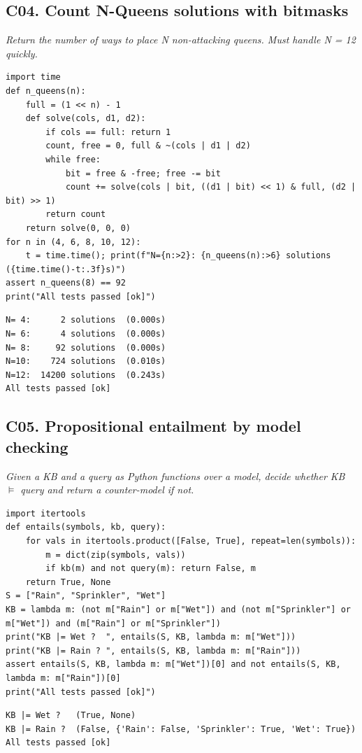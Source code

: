 \documentclass[11pt]{article}
\begin{document}
\subsection*{C04. Count N-Queens solutions with bitmasks \hfill{}}
\textit{Return the number of ways to place N non-attacking queens. Must handle N = 12 quickly.}
\begin{lstlisting}[style=py]
import time
def n_queens(n):
    full = (1 << n) - 1
    def solve(cols, d1, d2):
        if cols == full: return 1
        count, free = 0, full & ~(cols | d1 | d2)
        while free:
            bit = free & -free; free -= bit
            count += solve(cols | bit, ((d1 | bit) << 1) & full, (d2 | bit) >> 1)
        return count
    return solve(0, 0, 0)
for n in (4, 6, 8, 10, 12):
    t = time.time(); print(f"N={n:>2}: {n_queens(n):>6} solutions  ({time.time()-t:.3f}s)")
assert n_queens(8) == 92
print("All tests passed [ok]")
\end{lstlisting}
\begin{lstlisting}[style=out]
N= 4:      2 solutions  (0.000s)
N= 6:      4 solutions  (0.000s)
N= 8:     92 solutions  (0.000s)
N=10:    724 solutions  (0.010s)
N=12:  14200 solutions  (0.243s)
All tests passed [ok]
\end{lstlisting}
\subsection*{C05. Propositional entailment by model checking \hfill{}}
\textit{Given a KB and a query as Python functions over a model, decide whether KB $\models$ query and return a counter-model if not.}
\begin{lstlisting}[style=py]
import itertools
def entails(symbols, kb, query):
    for vals in itertools.product([False, True], repeat=len(symbols)):
        m = dict(zip(symbols, vals))
        if kb(m) and not query(m): return False, m
    return True, None
S = ["Rain", "Sprinkler", "Wet"]
KB = lambda m: (not m["Rain"] or m["Wet"]) and (not m["Sprinkler"] or m["Wet"]) and (m["Rain"] or m["Sprinkler"])
print("KB |= Wet ?  ", entails(S, KB, lambda m: m["Wet"]))
print("KB |= Rain ? ", entails(S, KB, lambda m: m["Rain"]))
assert entails(S, KB, lambda m: m["Wet"])[0] and not entails(S, KB, lambda m: m["Rain"])[0]
print("All tests passed [ok]")
\end{lstlisting}
\begin{lstlisting}[style=out]
KB |= Wet ?   (True, None)
KB |= Rain ?  (False, {'Rain': False, 'Sprinkler': True, 'Wet': True})
All tests passed [ok]
\end{lstlisting}
\end{document}
